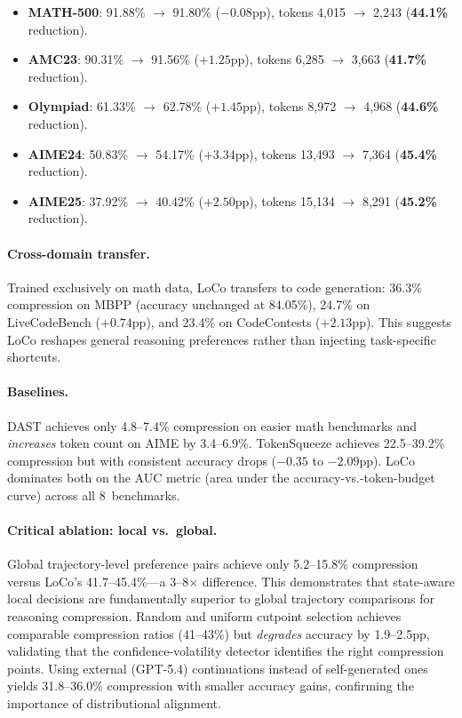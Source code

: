 \documentclass[11pt,a4paper]{article}
\begin{document}
\begin{itemize}
  \item \textbf{MATH-500}: 91.88\% $\to$ 91.80\% ($-0.08$pp), tokens 4{,}015 $\to$ 2{,}243 (\textbf{44.1\%} reduction).
  \item \textbf{AMC23}: 90.31\% $\to$ 91.56\% ($+1.25$pp), tokens 6{,}285 $\to$ 3{,}663 (\textbf{41.7\%} reduction).
  \item \textbf{Olympiad}: 61.33\% $\to$ 62.78\% ($+1.45$pp), tokens 8{,}972 $\to$ 4{,}968 (\textbf{44.6\%} reduction).
  \item \textbf{AIME24}: 50.83\% $\to$ 54.17\% ($+3.34$pp), tokens 13{,}493 $\to$ 7{,}364 (\textbf{45.4\%} reduction).
  \item \textbf{AIME25}: 37.92\% $\to$ 40.42\% ($+2.50$pp), tokens 15{,}134 $\to$ 8{,}291 (\textbf{45.2\%} reduction).
\end{itemize}

\paragraph{Cross-domain transfer.}
Trained exclusively on math data, LoCo transfers to code generation: 36.3\% compression on MBPP (accuracy unchanged at 84.05\%), 24.7\% on LiveCodeBench ($+0.74$pp), and 23.4\% on CodeContests ($+2.13$pp). This suggests LoCo reshapes general reasoning preferences rather than injecting task-specific shortcuts.

\paragraph{Baselines.}
DAST achieves only 4.8--7.4\% compression on easier math benchmarks and \emph{increases} token count on AIME by 3.4--6.9\%. TokenSqueeze achieves 22.5--39.2\% compression but with consistent accuracy drops ($-0.35$ to $-2.09$pp). LoCo dominates both on the AUC metric (area under the accuracy-vs.-token-budget curve) across all 8~benchmarks.

\paragraph{Critical ablation: local vs.\ global.}
Global trajectory-level preference pairs achieve only 5.2--15.8\% compression versus LoCo's 41.7--45.4\%---a 3--8$\times$ difference. This demonstrates that state-aware local decisions are fundamentally superior to global trajectory comparisons for reasoning compression. Random and uniform cutpoint selection achieves comparable compression ratios (41--43\%) but \emph{degrades} accuracy by 1.9--2.5pp, validating that the confidence-volatility detector identifies the right compression points. Using external (GPT-5.4) continuations instead of self-generated ones yields 31.8--36.0\% compression with smaller accuracy gains, confirming the importance of distributional alignment.
\end{document}
